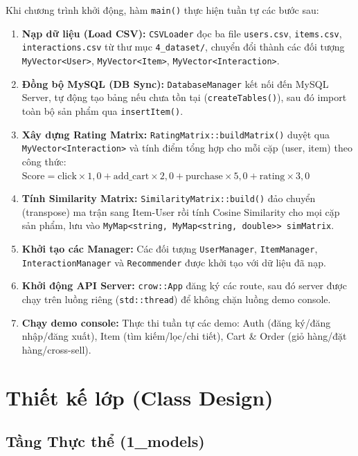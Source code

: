 \documentclass{report}
\begin{document}
Khi chương trình khởi động, hàm \texttt{main()} thực hiện tuần tự các bước sau:

\begin{enumerate}
    \item \textbf{Nạp dữ liệu (Load CSV):} \texttt{CSVLoader} đọc ba file \texttt{users.csv}, \texttt{items.csv}, \texttt{interactions.csv} từ thư mục \texttt{4\_dataset/}, chuyển đổi thành các đối tượng \texttt{MyVector<User>}, \texttt{MyVector<Item>}, \texttt{MyVector<Interaction>}.
    \item \textbf{Đồng bộ MySQL (DB Sync):} \texttt{DatabaseManager} kết nối đến MySQL Server, tự động tạo bảng nếu chưa tồn tại (\texttt{createTables()}), sau đó import toàn bộ sản phẩm qua \texttt{insertItem()}.
    \item \textbf{Xây dựng Rating Matrix:} \texttt{RatingMatrix::buildMatrix()} duyệt qua \texttt{MyVector<Interaction>} và tính điểm tổng hợp cho mỗi cặp (user, item) theo công thức:\newline
    $\text{Score} = \text{click} \times 1{,}0 + \text{add\_cart} \times 2{,}0 + \text{purchase} \times 5{,}0 + \text{rating} \times 3{,}0$

    \item \textbf{Tính Similarity Matrix:} \texttt{SimilarityMatrix::build()} đảo chuyển (transpose) ma trận sang Item-User rồi tính Cosine Similarity cho mọi cặp sản phẩm, lưu vào \texttt{MyMap<string, MyMap<string, double>> simMatrix}.
    \item \textbf{Khởi tạo các Manager:} Các đối tượng \texttt{UserManager}, \texttt{ItemManager}, \texttt{InteractionManager} và \texttt{Recommender} được khởi tạo với dữ liệu đã nạp.
    \item \textbf{Khởi động API Server:} \texttt{crow::App} đăng ký các route, sau đó server được chạy trên luồng riêng (\texttt{std::thread}) để không chặn luồng demo console.
    \item \textbf{Chạy demo console:} Thực thi tuần tự các demo: Auth (đăng ký/đăng nhập/đăng xuất), Item (tìm kiếm/lọc/chi tiết), Cart \& Order (giỏ hàng/đặt hàng/cross-sell).
\end{enumerate}

\section{Thiết kế lớp (Class Design)}

\subsection{Tầng Thực thể (1\_models)}
\end{document}
